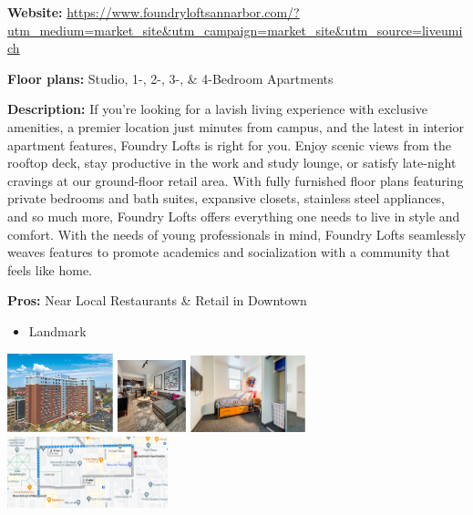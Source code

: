 \documentclass[
]{book}
\providecommand{\tightlist}{%
  \setlength{\itemsep}{0pt}\setlength{\parskip}{0pt}}
\begin{document}
\textbf{Website:} \url{https://www.foundryloftsannarbor.com/?utm_medium=market_site\&utm_campaign=market_site\&utm_source=liveumich}

\textbf{Floor plans:}
Studio, 1-, 2-, 3-, \& 4-Bedroom Apartments

\textbf{Description:}
If you're looking for a lavish living experience with exclusive amenities, a premier location just minutes from campus, and the latest in interior apartment features, Foundry Lofts is right for you. Enjoy scenic views from the rooftop deck, stay productive in the work and study lounge, or satisfy late-night cravings at our ground-floor retail area. With fully furnished floor plans featuring private bedrooms and bath suites, expansive closets, stainless steel appliances, and so much more, Foundry Lofts offers everything one needs to live in style and comfort. With the needs of young professionals in mind, Foundry Lofts seamlessly weaves features to promote academics and socialization with a community that feels like home.

\textbf{Pros:}
Near Local Restaurants \& Retail in Downtown

\begin{itemize}
\tightlist
\item
  Landmark
\end{itemize}

\includegraphics[width=0.23\textwidth,height=\textheight]{landmark_exterior1.png}
\includegraphics[width=0.15\textwidth,height=\textheight]{landmark_interior.png}
\includegraphics[width=0.25\textwidth,height=\textheight]{landmark_interior2.png}
\includegraphics[width=0.35\textwidth,height=\textheight]{landmark_map.png}
\end{document}
